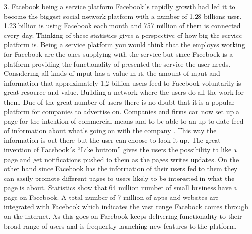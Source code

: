 \documentclass[conference]{IEEEtran}
\begin{document}
3. Facebook being a service platform
Facebook´s rapidly growth had led it to become the biggest social network
platform with a number of 1.28 billions user. 1.23 billion is using Facebook
each month and 757 million of them is connected every day. Thinking of these
statistics gives a perspective of how big the service platform is. Being a
service platform you would think that the employes working for Facebook are the
ones supplying with the service but since Facebook is a platform providing the
functionality of presented the service the user needs. Considering all kinds of
input has a value in it, the amount of input and information that approximately
1,2 billion users feed to Facebook voluntarily is great resource and value.
Building a network where the users do all the work for them. Due of the great
number of users there is no doubt that it is a popular platform for companies
to advertise on. Companies and firms can now set up a page for the intention of
commercial means and to be able to an up-to-date feed of information about
what's going on with the company . This way the information is out there but
the user can choose to look it up. The great invention of Facebook´s “Like
buttom” gives the users the possibility to like a page and get notifications
pushed to them as the pages writes updates. On the other hand since Facebook
has the information of their users fed to them they can easily promote
different pages to users likely to be interested in what the page is about.
Statistics show that 64%
million number of small business have a page on Facebook. A total number of 7
million of apps and websites are integrated with Facebook which indicates the
vast range Facebook comes through on the internet. As this goes on Facebook
keeps delivering functionality to their broad range of users and is frequently
launching new features to the platform.
\end{document}
